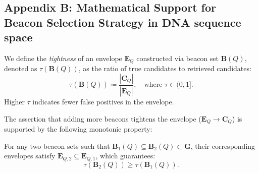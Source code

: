 \documentclass[10pt,runningheads]{llncs}
\begin{document}
\newpage
\subsection*{Appendix B: Mathematical Support for Beacon Selection Strategy in DNA sequence space}

\begin{definition}
    We define the \textit{tightness} of an envelope $\textbf{E}_Q$ constructed via beacon set $\textbf{B}(Q)$, denoted as $\tau(\textbf{B}(Q))$, as the ratio of true candidates to retrieved candidates:
    \begin{equation}
        \tau(\textbf{B}(Q)) \coloneqq \frac{|\textbf{C}_Q|}{|\textbf{E}_Q|}, \quad \text{where } \tau \in (0, 1].
    \end{equation}
    Higher $\tau$ indicates fewer false positives in the envelope.
    \label{def:tightness}
\end{definition}

The assertion that adding more beacons tightens the envelope ($\textbf{E}_Q \rightarrow \textbf{C}_Q$) is supported by the following monotonic property:

\begin{remark}
    For any two beacon sets such that $\textbf{B}_1(Q) \subseteq \textbf{B}_2(Q) \subset \textbf{G}$, their corresponding envelopes satisfy $\textbf{E}_{Q, 2} \subseteq \textbf{E}_{Q, 1}$, which guarantees:
    \begin{equation}
        \tau(\textbf{B}_2(Q)) \geq \tau(\textbf{B}_1(Q)).
    \end{equation}
    \label{cor:moreisbetter}
\end{remark}
\end{document}
